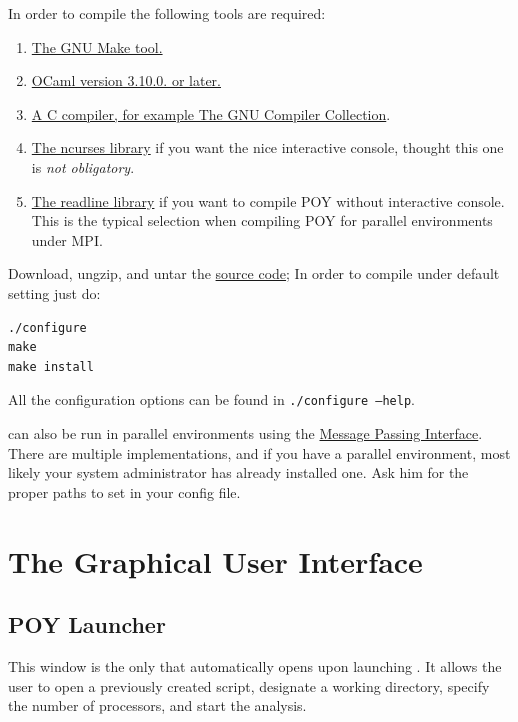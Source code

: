 In order to compile \poy the following tools are required:

\begin{enumerate}
    \item \href{http://www.gnu.org/software/make/}{The GNU Make tool.}
    \item \href{http://www.ocaml.org}{OCaml version 3.10.0. or later.}
    \item \href{http://gcc.gnu.org/}{A C compiler, for example The GNU Compiler Collection}.
    \item \href{http://www.gnu.org/software/ncurses/}{The ncurses library} if
        you want the nice interactive console, thought this one is
        \emph{not obligatory}.
    \item \href{http://tiswww.case.edu/php/chet/readline/rltop.html}{The
        readline library} if you want
        to compile POY without interactive console. This is the typical
        selection when compiling POY for parallel environments under MPI.
\end{enumerate}

Download, ungzip, and untar the
\href{http://research.amnh.org/scicomp/projects/poy.php}{\poy source code};
In order to compile under default setting just do:
\begin{verbatim}
./configure
make
make install
\end{verbatim}
All the configuration options can be found in {\tt ./configure --help}.

\poy can also be run in parallel environments using the
\href{http://www-unix.mcs.anl.gov/mpi/}{Message Passing Interface}. There are
multiple implementations, and if you have a parallel environment, most likely
your system administrator has already installed one. Ask him for the proper
paths to set in your config file.

\section{The Graphical User Interface}

\subsection{POY Launcher} 
This window is the only that automatically opens upon launching
\poy. It allows the user to open a previously created script,
designate a working directory, specify the number of processors,
and start the analysis.

